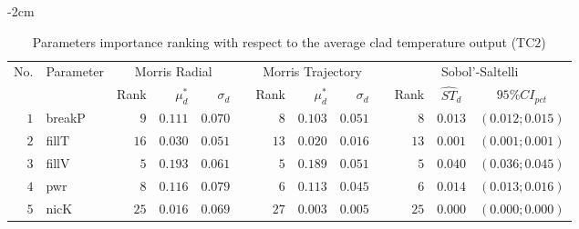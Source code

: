 \begin{table*}[!htbp]\centering
{}
\begin{adjustwidth*}{}{-2cm}
\caption{Parameters importance ranking with respect to the average clad temperature output (TC$2$)}
\label{tab:app_screening_tc2_average}
\begin{tabular}{@{}rlrrrrrrrrrcc@{}}\toprule
\multirow{2}{*}{\footnotesize{No.}} & \multirow{2}{*}{\footnotesize{Parameter}} & \multicolumn{3}{c}{\footnotesize{Morris Radial}} & \phantom{a} & \multicolumn{3}{c}{\footnotesize{Morris Trajectory}}  &\phantom{a}& \multicolumn{3}{c}{\footnotesize{Sobol'-Saltelli}}                               \\             
                                                                                  \cmidrule{3-5}                                                   \cmidrule{7-9}                                                      \cmidrule{11-13}
                                    &                                           & \footnotesize{Rank}   & $\mu^*_d$ & $\sigma_d$   &             & \footnotesize{Rank} & $\mu^*_d$ & $\sigma_d$          &           & \footnotesize{Rank} & \footnotesize{$\hat{ST}_d$} & \footnotesize{$95\%CI_{pct}$}\\ \midrule
\footnotesize{$1 $} & \footnotesize{breakP   } & \footnotesize{$9 $} & \footnotesize{$0.111$} & \footnotesize{$0.070$} && \footnotesize{$8 $} & \footnotesize{$0.103$} & \footnotesize{$0.051$} && \footnotesize{$8 $} & \footnotesize{$0.013$} & \footnotesize{$(0.012;0.015)$} \\
\footnotesize{$2 $} & \footnotesize{fillT    } & \footnotesize{$16$} & \footnotesize{$0.030$} & \footnotesize{$0.051$} && \footnotesize{$13$} & \footnotesize{$0.020$} & \footnotesize{$0.016$} && \footnotesize{$13$} & \footnotesize{$0.001$} & \footnotesize{$(0.001;0.001)$} \\
\footnotesize{$3 $} & \footnotesize{fillV    } & \footnotesize{$5 $} & \footnotesize{$0.193$} & \footnotesize{$0.061$} && \footnotesize{$5 $} & \footnotesize{$0.189$} & \footnotesize{$0.051$} && \footnotesize{$5 $} & \footnotesize{$0.040$} & \footnotesize{$(0.036;0.045)$} \\
\footnotesize{$4 $} & \footnotesize{pwr      } & \footnotesize{$8 $} & \footnotesize{$0.116$} & \footnotesize{$0.079$} && \footnotesize{$6 $} & \footnotesize{$0.113$} & \footnotesize{$0.045$} && \footnotesize{$6 $} & \footnotesize{$0.014$} & \footnotesize{$(0.013;0.016)$} \\
\footnotesize{$5 $} & \footnotesize{nicK     } & \footnotesize{$25$} & \footnotesize{$0.016$} & \footnotesize{$0.069$} && \footnotesize{$27$} & \footnotesize{$0.003$} & \footnotesize{$0.005$} && \footnotesize{$25$} & \footnotesize{$0.000$} & \footnotesize{$(0.000;0.000)$} \\

\end{tabular}
\end{adjustwidth*}
\end{table*}
